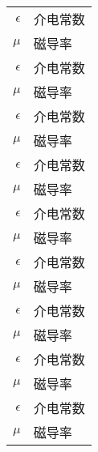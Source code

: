\begin{longtable}{rl}
 $\epsilon$     & 介电常数 \\
 $\mu$ 		& 磁导率 \\
 $\epsilon$ 	& 介电常数 \\
 $\mu$ 		& 磁导率 \\
 $\epsilon$     & 介电常数 \\
 $\mu$ 		& 磁导率 \\
 $\epsilon$     & 介电常数 \\
 $\mu$ 		& 磁导率 \\
 $\epsilon$     & 介电常数 \\
 $\mu$ 		& 磁导率 \\
 $\epsilon$ 	& 介电常数 \\
 $\mu$ 		& 磁导率 \\
 $\epsilon$     & 介电常数 \\
 $\mu$ 		& 磁导率 \\
 $\epsilon$     & 介电常数 \\
 $\mu$ 		& 磁导率 \\
 $\epsilon$     & 介电常数 \\
 $\mu$ 		& 磁导率 \\
\end{longtable}

